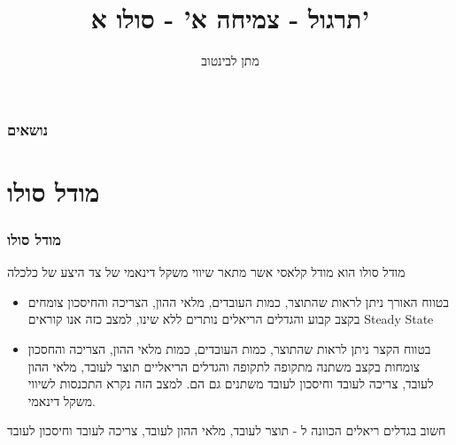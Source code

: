 \documentclass[usenames,dvipsnames, 10pt]{beamer}
\title{תרגול - צמיחה א' - סולו א'}
\author{\texthebrew{ מתן לבינטוב}}
\institute[{{אב"ג}}]{{ אוניברסיטת בן גוריון בנגב}}
\date{}
\begin{document}
\begin{RTL}
\begin{frame}
\titlepage
\end{frame}
\begin{frame}
    \frametitle{נושאים}
    \tableofcontents

    

\end{frame}

\section{מודל סולו}
\begin{frame}[allowframebreaks]
    \frametitle{מודל סולו}
    מודל סולו הוא מודל קלאסי אשר מתאר שיווי משקל דינאמי של צד היצע של כלכלה
    \begin{itemize}
        \item בטווח האורך  ניתן לראות שהתוצר, כמות העובדים, מלאי ההון, הצריכה והחיסכון צומחים בקצב קבוע והגדלים הריאלים נותרים ללא שינו, למצב כזה אנו קוראים Steady State
        \item בטווח הקצר ניתן לראות שהתוצר, כמות העובדים, כמות מלאי ההון, הצריכה והחסכון צומחות
        בקצב משתנה מתקופה לתקופה והגדלים הריאליים תוצר לעובד, מלאי ההון לעובד, צריכה
        לעובד וחיסכון לעובד  משתנים גם הם. למצב הזה נקרא התכנסות לשיווי משקל דינאמי.
    \end{itemize}
    \begin{alertblock}{חשוב}
        בגדלים ריאלים הכוונה ל - תוצר לעובד, מלאי ההון לעובד, צריכה לעובד
        וחיסכון לעובד
    \end{alertblock}

    \framebreak

    

\end{frame}
\end{RTL}
\end{document}
